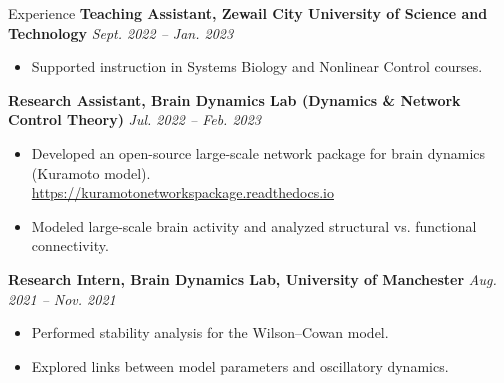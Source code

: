 \documentclass{resume} %
\begin{document}
\begin{rSection}{Experience}
\textbf{Teaching Assistant, Zewail City University of Science and Technology} \hfill \textit{Sept. 2022 -- Jan. 2023}
\begin{itemize}
    \item Supported instruction in Systems Biology and Nonlinear Control courses.
\end{itemize}

\textbf{Research Assistant, Brain Dynamics Lab (Dynamics \& Network Control Theory)} \hfill \textit{Jul. 2022 -- Feb. 2023}
\begin{itemize}
    \item Developed an open-source large-scale network package for brain dynamics (Kuramoto model). \\ \url{https://kuramotonetworkspackage.readthedocs.io}
    \item Modeled large-scale brain activity and analyzed structural vs. functional connectivity.
\end{itemize}

\textbf{Research Intern, Brain Dynamics Lab, University of Manchester} \hfill \textit{Aug. 2021 -- Nov. 2021}
\begin{itemize}
    \item Performed stability analysis for the Wilson--Cowan model.
    \item Explored links between model parameters and oscillatory dynamics.
\end{itemize}

\end{rSection}

\end{document}
